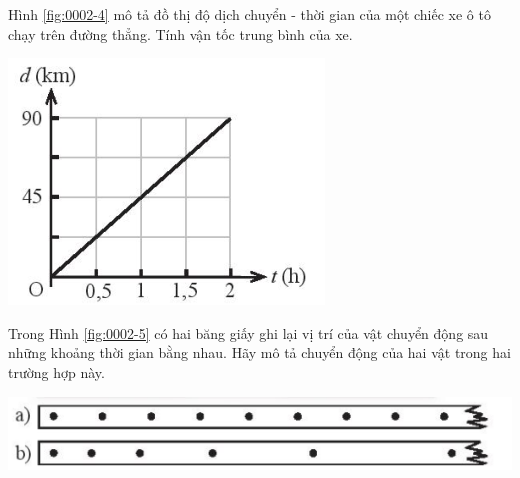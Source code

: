\begin{ex}
	Hình \ref{fig:0002-4} mô tả đồ thị độ dịch chuyển - thời gian của một chiếc xe ô tô chạy trên đường thẳng. Tính vận tốc trung bình của xe.
	\begin{center}
		\includegraphics[scale=0.6]{figs/G10Y25B5-7}
		\label{fig:0002-4}
	\end{center}
\end{ex}

\begin{ex}
	Trong Hình \ref{fig:0002-5} có hai băng giấy ghi lại vị trí của vật chuyển động sau những khoảng thời gian bằng nhau. Hãy mô tả chuyển động của hai vật trong hai trường hợp này.
	\begin{center}
		\includegraphics[scale=0.5]{figs/G10Y25B5-8}
		\label{fig:0002-5}
	\end{center}
\end{ex}

